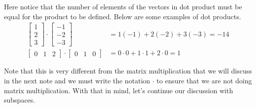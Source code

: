 \documentclass[../../main.tex]{subfiles}
\begin{document}
Here notice that the number of elements of the vectors in dot product
must be equal for the product to be defined. Below are some examples
of dot products.
\begin{align*}
\begin{bmatrix}
    1 \\
    2 \\
    3
\end{bmatrix}
\cdot
\begin{bmatrix}
    -1 \\
    -2 \\
    -3
\end{bmatrix}
&= 1(-1) + 2(-2) + 3(-3)
= -14 \\
\begin{bmatrix}
    0 & 1 & 2
\end{bmatrix}
\cdot
\begin{bmatrix}
    0 & 1 & 0
\end{bmatrix}
&= 0 \cdot 0 + 1 \cdot 1 + 2 \cdot 0
= 1
\end{align*}

Note that this is very different from the matrix multiplication
that we will discuss in the next note and we must write the
notation $\cdot$ to ensure that we are not doing matrix
multiplication. With that in mind, let's continue our discussion
with subspaces.
\end{document}
